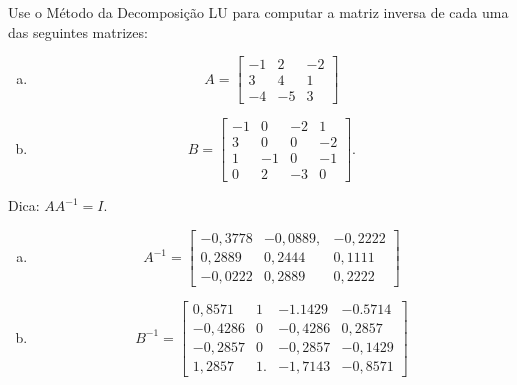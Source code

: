 \begin{exer}
  Use o Método da Decomposição LU para computar a matriz inversa de cada uma das seguintes matrizes:
  \begin{enumerate}[a)]
  \item
  \begin{equation}
    A =
    \begin{bmatrix}
      -1 & 2 & -2\\
      3 & 4 & 1\\
      -4 & -5 & 3
    \end{bmatrix}
  \end{equation}
\item
  \begin{equation}
    B =
    \begin{bmatrix}
      -1 & 0 & -2 & 1\\
      3 & 0 & 0 & -2\\
      1 & -1 & 0 & -1\\
      0 & 2 & -3 & 0
    \end{bmatrix}.
  \end{equation}  
\end{enumerate}
\end{exer}
\begin{resp}
  Dica: $AA^{-1} = I$.
  \begin{enumerate}[a)]
  \item
    \begin{equation}
      A^{-1} =
      \begin{bmatrix}
        -0,3778 & -0,0889, & -0,2222\\
         0,2889 & 0,2444  & 0,1111\\
         -0,0222 & 0,2889 & 0,2222
      \end{bmatrix}
    \end{equation}
  \item
    \begin{equation}
      B^{-1} =
      \begin{bmatrix}
        0,8571  & 1 & -1.1429 & -0.5714\\
        -0,4286 & 0 & -0,4286 & 0,2857\\
        -0,2857 & 0 & -0,2857 & -0,1429\\
        1,2857 &  1. &-1,7143 & -0,8571
      \end{bmatrix}
    \end{equation}
  \end{enumerate}
\end{resp}

